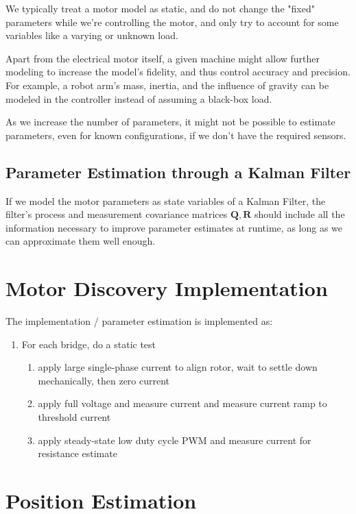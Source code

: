 \documentclass[12pt,a4paper,oneside,openany]{article}
\newcommand{\mQ}{\ensuremath{\mathbf{Q}}}
\newcommand{\mR}{\ensuremath{\mathbf{R}}}
\begin{document}
We typically treat a motor model as static, and do not change the "fixed" parameters while we're controlling the motor, and only try to account for some variables like a varying or unknown load.

Apart from the electrical motor itself, a given machine might allow further modeling to increase the model's fidelity, and thus control accuracy and precision. For example, a robot arm's mass, inertia, and the influence of gravity can be modeled in the controller instead of assuming a black-box load.

As we increase the number of parameters, it might not be possible to estimate parameters, even for known configurations, if we don't have the required sensors.

\subsection{Parameter Estimation through a Kalman Filter}

If we model the motor parameters as state variables of a Kalman Filter, the filter's process and measurement covariance matrices $\mQ, \mR$ should include all the information necessary to improve parameter estimates at runtime, as long as we can approximate them well enough.

\section{Motor Discovery Implementation}


The implementation / parameter estimation is implemented as:
\begin{enumerate}
\item For each bridge, do a static test
    \begin{enumerate}
    \item apply large single-phase current to align rotor, wait to settle down mechanically, then zero current
    \item apply full voltage and measure current and measure current ramp to threshold current
    \item apply steady-state low duty cycle PWM and measure current for resistance estimate
    \end{enumerate}
\end{enumerate}


\section{Position Estimation}
\end{document}
